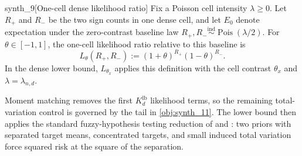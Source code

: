 \documentclass[11pt]{article}
\begin{document}
\begin{definitionv}{synth_9}[One-cell dense likelihood ratio]
Fix a Poisson cell intensity \(\lambda\ge0\). Let \(R_+\) and \(R_-\) be the two sign counts in one dense cell, and let \(E_0\) denote expectation under the zero-contrast baseline law \(R_+,R_-\stackrel{\mathrm{ind}}{\sim}\operatorname{Pois}(\lambda/2)\). For \(\theta\in[-1,1]\), the one-cell likelihood ratio relative to this baseline is \[ L_\theta(R_+,R_-):=(1+\theta)^{R_+}(1-\theta)^{R_-}. \] In the dense lower bound, \(L_{\theta_x}\) applies this definition with the cell contrast \(\theta_x\) and \(\lambda=\lambda_{n,d}\).
\end{definitionv}

Moment matching removes the first \(K_d^{\mathrm{lb}}\) likelihood terms, so the remaining total-variation control is governed by the tail in \cref{obj:synth_11}. The lower bound then applies the standard fuzzy-hypothesis testing reduction of \citet{LeCam1986} and \citet{Tsybakov2009}: two priors with separated target means, concentrated targets, and small induced total variation force squared risk at the square of the separation.
\end{document}
